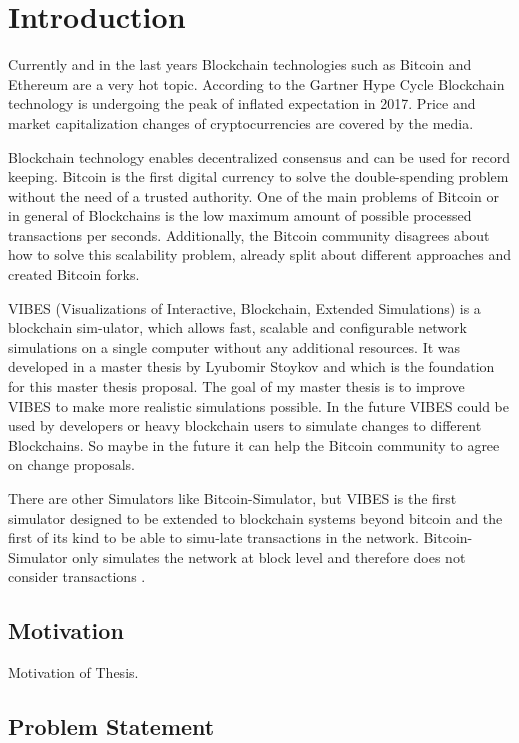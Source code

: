 \chapter{Introduction} 
\label{chapter:introduction}

Currently and in the last years Blockchain technologies such as Bitcoin and Ethereum are a very hot topic. According to the Gartner Hype Cycle \cite{gartner} Blockchain technology is undergoing the peak of inflated expectation in 2017. Price and market capitalization changes of cryptocurrencies are covered by the media.

Blockchain technology enables decentralized consensus and can be used for record keeping. Bitcoin is the first digital currency to solve the double-spending problem without the need of a trusted authority. One of the main problems of Bitcoin or in general of Blockchains is the low maximum amount of possible processed transactions per seconds. Additionally, the Bitcoin community disagrees about how to solve this scalability problem, already split about different approaches and created Bitcoin forks.

VIBES (Visualizations of Interactive, Blockchain, Extended Simulations) is a blockchain sim-ulator, which allows fast, scalable and configurable network simulations on a single
computer without any additional resources. It was developed in a master thesis by Lyubomir Stoykov \cite{vibes} and which is the foundation for this master thesis proposal. The goal of my master thesis is to improve VIBES to make more realistic simulations possible. In the future VIBES could be used by developers or heavy blockchain users to simulate changes to different Blockchains. So maybe in the future it can help the Bitcoin community to agree on change proposals.

There are other Simulators like Bitcoin-Simulator, but VIBES is the first simulator designed to be extended to blockchain systems beyond bitcoin and the first of its kind to be able to simu-late transactions in the network. Bitcoin-Simulator only simulates the network at block level and therefore does not consider transactions \cite{sec&perf}.

\section{Motivation} 
\label{sec:motivation}

Motivation of Thesis.

\section{Problem Statement} 
\label{sec:problemStatement}

